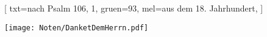 [
    txt={nach Psalm 106, 1},
    gruen={93},
    mel={aus dem 18. Jahrhundert},
    ]

\centering\texttt{[image: Noten/DanketDemHerrn.pdf]}

\endsong
